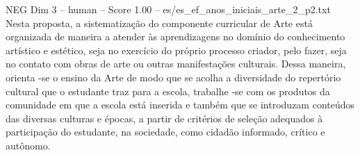 \begin{textsample}{NEG Dim 3 – human – Score 1.00 – es/es\_ef\_anos\_iniciais\_arte\_2\_p2.txt}  \label{ex:f3_neg_001}
Nesta proposta, a sistematização do componente curricular de Arte está organizada de maneira a atender às aprendizagens no domínio do conhecimento artístico e estético, seja no exercício do próprio processo criador, pelo fazer, seja no contato com obras de arte ou outras manifestações culturais.
Dessa maneira, orienta -se o ensino da Arte de modo que se acolha a diversidade do repertório cultural que o estudante traz para a escola, trabalhe -se com os produtos da comunidade em que a escola está inserida e também que se introduzam conteúdos das diversas culturas e épocas, a partir de critérios de seleção adequados à participação do estudante, na sociedade, como cidadão informado, crítico e autônomo.

\end{textsample}
